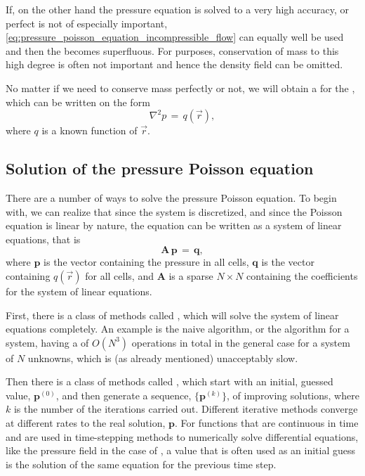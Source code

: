 If, on the other hand the pressure equation is solved to a very high accuracy, or perfect  is not of especially important, \eqref{eq:pressure_poisson_equation_incompressible_flow} can equally well be used and then the  becomes superfluous. For \simulation purposes, conservation of mass to this high degree is often not important and hence the density field can be omitted.

No matter if we need to conserve mass perfectly or not, we will obtain a  for the , which can be written on the form
%
\begin{equation} \label{eq:pressure_poisson_equation_general}
\nabla^2 p \,=\, q(\vec{r}),
\end{equation}
%
where $q$ is a known function of $\vec{r}$.

\subsection{Solution of the pressure Poisson equation}

\label{sec:pressure_poisson_equation_solution}

There are a number of ways to solve the pressure Poisson equation. To begin with, we can realize that since the system is discretized, and since the Poisson equation is linear by nature, the equation can be written as a system of linear equations, that is
%
\begin{equation} \label{eq:pressure_poisson_equation_matrix}
\mathbf{A\,p} \,=\, \mathbf{q},
\end{equation}
%
where $\mathbf{p}$ is the vector containing the pressure in all cells, $\mathbf{q}$ is the vector containing $q(\vec{r})$ for all cells, and $\mathbf{A}$ is a sparse $N\times N$  containing the coefficients for the system of linear equations.

First, there is a class of methods called , which will solve the system of linear equations completely. An example is the naive  algorithm, or the  algorithm for a  system, having a  of $O(N^3)$ operations in total in the general case for a system of $N$ unknowns, which is (as already mentioned) unacceptably slow.

Then there is a class of methods called , which start with an initial, guessed value, $\mathbf{p}^{(0)}$, and then generate a sequence, $\{\mathbf{p}^{(k)}\}$, of improving \approximate solutions, where $k$ is the number of the iterations carried out. Different iterative methods converge at different rates to the real solution, $\mathbf{p}$. For functions that are continuous in time and are used in time-stepping methods to numerically solve differential equations, like the pressure field in the case of \CFD, a value that is often used as an initial guess is the solution of the same equation for the previous time step.

